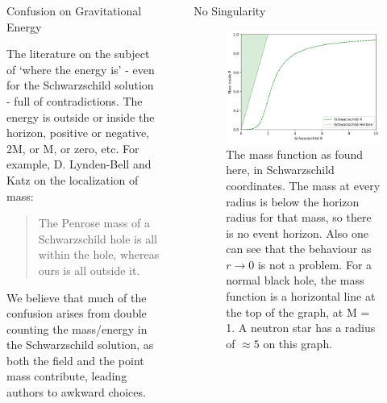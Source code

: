 \documentclass[final]{beamer}
\newlength{\sepwidth}
\newlength{\colwidth}
\newcommand{\separatorcolumn}{\begin{column}{\sepwidth}\end{column}}
\begin{document}
\begin{frame}[t]
\begin{columns}[t]
\begin{column}{\colwidth}
\begin{alertblock}{Confusion on Gravitational Energy}

The literature on the subject of `where the energy is' - even for the Schwarzschild solution - full of contradictions. The energy is outside or inside the horizon, positive or negative, 2M, or M, or zero, etc.  For example, D. Lynden-Bell and Katz on the localization of mass:\cite{lyndenbell1985}

\begin{quotation}
	The Penrose mass of a Schwarzschild hole is all within the hole, whereas ours is all outside it.
\end{quotation}

We believe that much of the confusion arises from double counting the mass/energy in the Schwarzschild solution, as both the field and the point mass contribute, leading authors to awkward choices. 

\end{alertblock}


\end{column}

\separatorcolumn


\begin{column}{\colwidth}

  \begin{exampleblock}{No Singularity}

    \begin{figure}
\includegraphics[width=0.9\columnwidth]{no-horizons-s.png}
\caption{The mass function as found here, in Schwarzschild coordinates. The mass at every radius is below the horizon radius for that mass, so there is no event horizon. Also one can see that the behaviour as $r \rightarrow 0$ is not a problem. For a normal black hole, the mass function is a horizontal line at the top of the graph, at M = 1. A neutron star has a radius of $\approx 5$ on this graph.}
\label{sw-energy-hole-fig}
\end{figure} 


\end{exampleblock}
\end{column}
\end{columns}
\end{frame}
\end{document}
